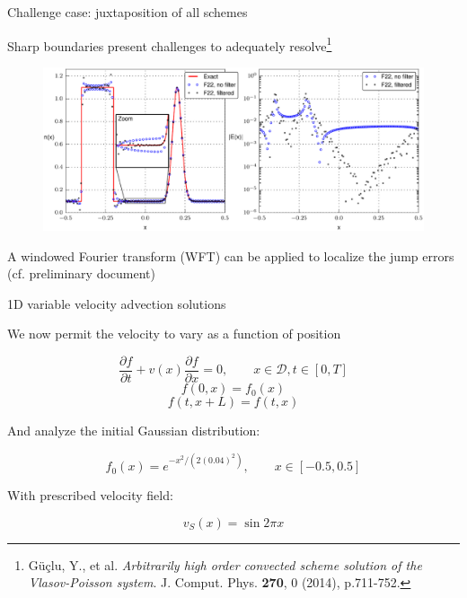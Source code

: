 \documentclass{beamer}
\begin{document}
\begin{frame}{Challenge case: juxtaposition of all schemes}

Sharp boundaries present challenges to adequately resolve\footnote{G\"{u}\c{c}lu, Y., et al. \emph{Arbitrarily high order convected scheme solution of the Vlasov-Poisson system}. J. Comput. Phys. \textbf{270}, 0 (2014), p.711-752.}
\vspace*{-3mm}
\begin{figure}[h!]
  \centering
    \includegraphics[width=\textwidth]{graphics/WFT_example}
\end{figure}
\vspace*{-5mm}
A windowed Fourier transform (WFT) can be applied to localize the jump errors (cf. preliminary document) 


\end{frame}


\begin{frame}{1D variable velocity advection solutions}

We now permit the velocity to vary as a function of position
 

$$\frac{\partial f}{\partial t} + v(x)\frac{\partial f}{\partial x} =  0, \qquad x\in\mathcal{D}, t\in [0,T]$$
$$f(0,x) = f_0(x) $$
$$f(t,x + L) = f(t,x)$$

And analyze the initial Gaussian distribution:

$$f_0(x) = e^{-x^2 / (2(0.04)^2)}, \qquad x\in [-0.5, 0.5]$$

With prescribed velocity field:

$$v_S(x) = \sin 2\pi x$$




\end{frame}
\end{document}
